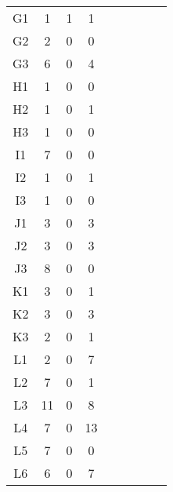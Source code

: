 \begin{center}
\begin{longtable}{ccccc|cccc}
G1    & 1     & 1     & 1 \\
G2    & 2     & 0     & 0 \\
G3    & 6     & 0     & 4 \\
H1    & 1     & 0     & 0 \\
H2    & 1     & 0     & 1 \\
H3    & 1     & 0     & 0 \\
I1    & 7     & 0     & 0 \\
I2    & 1     & 0     & 1 \\
I3    & 1     & 0     & 0 \\
J1    & 3     & 0     & 3 \\
J2    & 3     & 0     & 3 \\
J3    & 8     & 0     & 0 \\
K1    & 3     & 0     & 1 \\
K2    & 3     & 0     & 3 \\
K3    & 2     & 0     & 1 \\
L1    & 2     & 0     & 7 \\
L2    & 7     & 0     & 1 \\
L3    & 11    & 0     & 8 \\
L4    & 7     & 0     & 13 \\
L5    & 7     & 0     & 0 \\
L6    & 6     & 0     & 7 \\

\end{longtable}
\end{center}


